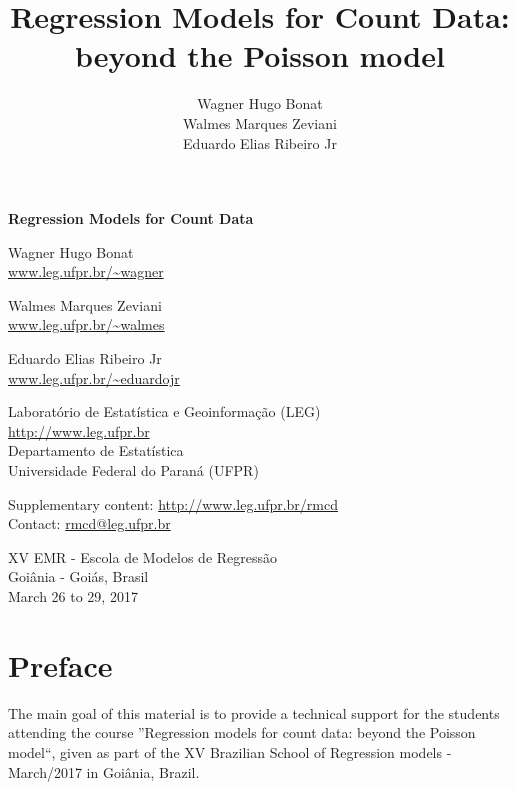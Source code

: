 \documentclass[9pt,a5paper,]{book}
\title{Regression Models for Count Data: beyond the Poisson model}
\author{Wagner Hugo Bonat \\ Walmes Marques Zeviani \\ Eduardo Elias Ribeiro Jr}
\date{}
\begin{document}
\maketitle

\thispagestyle{empty}
\cleardoublepage
\thispagestyle{empty}


\begin{flushleft}
  \Large \bf
  Regression Models for Count Data
\end{flushleft}
\vspace*{1.5em}

\begin{flushleft}
Wagner Hugo Bonat\\
\url{www.leg.ufpr.br/~wagner}

Walmes Marques Zeviani\\
\url{www.leg.ufpr.br/~walmes}

Eduardo Elias Ribeiro Jr\\
\url{www.leg.ufpr.br/~eduardojr}
\end{flushleft}
\vspace*{2em}

Laboratório de Estatística e Geoinformação (LEG)\\
\url{http://www.leg.ufpr.br}\\
Departamento de Estatística\\
Universidade Federal do Paraná (UFPR)

Supplementary content: \url{http://www.leg.ufpr.br/rmcd}\\
Contact: \url{rmcd@leg.ufpr.br}
\vspace*{\fill}

\begin{center}
XV EMR - Escola de Modelos de Regressão\\
Goiânia - Goiás, Brasil\\
March 26 to 29, 2017
\end{center}

\clearpage
\thispagestyle{empty}
\pagebreak

\setcounter{page}{1}

{
\setcounter{tocdepth}{1}
\tableofcontents
}
\chapter*{Preface}\label{preface}

The main goal of this material is to provide a technical support for the
students attending the course ''Regression models for count data: beyond
the Poisson model``, given as part of the XV Brazilian School of
Regression models - March/2017 in Goiânia, Brazil.
\end{document}
